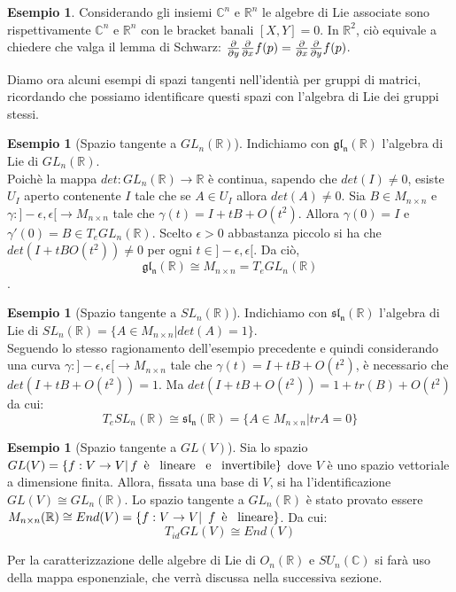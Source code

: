 \documentclass[12pt,a4paper]{report}
\theoremstyle{definition}
\theoremstyle{definition}
\newtheorem{Ex}[Def]{Esempio}
\theoremstyle{definition}
\theoremstyle{definition}
\begin{document}
\begin{Ex}
	Considerando gli insiemi $\mathbb{C}^n$ e $\mathbb{R}^n$ le algebre di Lie associate sono rispettivamente $\mathbb{C}^n$ e $\mathbb{R}^n$ con le bracket banali $[X,Y]=0$. In $\mathbb{R}^2$, ciò equivale a chiedere che valga il lemma di Schwarz: ${\partial\over\partial y}{\partial\over\partial x}f(p)={\partial\over\partial x}{\partial\over\partial y}f(p)$.
\end{Ex}
Diamo ora alcuni esempi di spazi tangenti nell'identià per gruppi di matrici, ricordando che possiamo identificare questi spazi con l'algebra di Lie dei gruppi stessi.
\begin{Ex}[Spazio tangente a $GL_n(\mathbb{R})$]
	Indichiamo con $\mathfrak{gl_n(\mathbb{R})}$ l'algebra di Lie di $GL_n(\mathbb{R})$.
	\\
	Poichè la mappa $det:GL_n(\mathbb{R})\rightarrow\mathbb{R}$ è continua, sapendo che $det(I)\neq 0$, esiste $U_I$ aperto contenente $I$ tale che se $A\in U_I$ allora $det(A)\neq 0$. Sia $B\in M_{n\times n}$ e $\gamma:]-\epsilon,\epsilon[\rightarrow M_{n\times n}$ tale che $\gamma(t)=I+tB+O(t^2)$. Allora $\gamma(0)=I$ e $\gamma'(0)=B\in T_eGL_n(\mathbb{R})$. Scelto $\epsilon>0$ abbastanza piccolo si ha che $det(I+tBO(t^2))\neq 0$ per ogni $t\in]-\epsilon,\epsilon[$. Da ciò, $$\mathfrak{gl_n(\mathbb{R})}\cong M_{n\times n}= T_eGL_n(\mathbb{R})$$.
\end{Ex}
\begin{Ex}[Spazio tangente a $SL_n(\mathbb{R})$]
	Indichiamo con $\mathfrak{sl_n(\mathbb{R})}$ l'algebra di Lie di $SL_n(\mathbb{R})=\{A\in M_{n\times n}|det(A)=1\}$.\\
	Seguendo lo stesso ragionamento dell'esempio precedente e quindi considerando una curva $\gamma:]-\epsilon,\epsilon[\rightarrow M_{n\times n}$ tale che $\gamma(t)=I+tB+O(t^2)$, è necessario che $det(I+tB+O(t^2))=1$. Ma $det(I+tB+O(t^2))=1+tr(B)+O(t^2)$ da cui: $$T_eSL_n(\mathbb{R})\cong \mathfrak{sl_n(\mathbb{R})}=\{A\in M_{n\times n}|trA=0\}$$ 
\end{Ex}
\begin{Ex}[Spazio tangente a $GL(V)$]
	Sia lo spazio $GL(V)=\{f:V\rightarrow V|\, \textnormal{$f$\,  è \, lineare \, e \, invertibile}\}$ dove $V$ è uno spazio vettoriale a dimensione finita. Allora, fissata una base di $V$, si ha l'identificazione $GL(V)\cong GL_n(\mathbb{R})$. Lo spazio tangente a $GL_n(\mathbb{R})$ è stato provato essere $M_{n\times n}(\mathbb{R})\cong End(V)=\{f:V\rightarrow V|\textnormal{\, $f$\, è \, lineare}\}$. Da cui: 
	$$T_{id}GL(V)\cong End(V)$$ 
\end{Ex}
Per la caratterizzazione delle algebre di Lie di $O_n(\mathbb{R})$ e $SU_n(\mathbb{C})$ si farà uso della mappa esponenziale, che verrà discussa nella successiva sezione.
\end{document}
